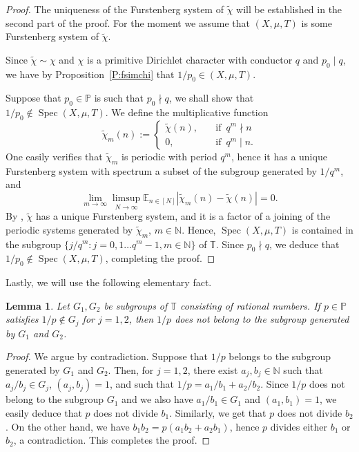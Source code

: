 \documentclass[11pt]{amsart}
\newtheorem{lemma}{Lemma}[section]
\theoremstyle{definition}
\newcommand{\E}{{\mathbb E}}
\newcommand{\N}{{\mathbb N}}
\renewcommand{\P}{{\mathbb P}}
\newcommand{\T}{{\mathbb T}}
\DeclareMathOperator{\spec}{Spec}
\begin{document}
\begin{proof}
The uniqueness of the Furstenberg system of $\tilde{\chi}$ will be established in the second part of the proof. For the moment we assume that $(X,\mu,T)$ is some Furstenberg system of $\tilde{\chi}$. 

Since $\tilde{\chi}\sim \chi$ and  $\chi$ is a primitive Dirichlet character with conductor $q$ and $p_0\mid q$,  we have by Proposition~\ref{P:fsimchi} that $1/p_0\in (X,\mu,T)$. 


 Suppose that $p_0\in \P$ is such that  $p_0\nmid q$, we shall   show that $1/p_0\not\in \spec(X,\mu,T)$. We define the multiplicative function 
$$
\tilde{\chi}_m(n):=\begin{cases}
	\tilde{\chi}(n), \quad & \text{if }\,  q^m\nmid n \\
	0, \quad & \text{if } \, q^m\mid n.
\end{cases} 
$$
One easily verifies that $\tilde{\chi}_m$ is periodic with period $q^m$, hence it has a unique  Furstenberg system with spectrum   a subset of  the subgroup generated by $1/q^m$, and 
$$
\lim_{m\to\infty}\limsup_{N\to\infty}\E_{n\in[N]} |\tilde{\chi}_m(n)-\tilde{\chi}(n)|=0.
$$
By   \cite[Lemma~3.17]{BPLR19},  $\tilde{\chi}$ has a unique Furstenberg system, and it  is a factor of
a joining of the periodic systems generated by $\tilde{\chi}_m$, $m\in \N$.
Hence,
$\spec(X,\mu,T)$ is contained in the subgroup $\{j/q^m\colon j=0,1\ldots q^m-1,m\in \N\}$ of $\T$.  Since  $p_0\nmid q$, we deduce that $1/p_0\not\in \spec(X,\mu,T)$, completing the proof.
\end{proof}
Lastly, we will use the following elementary fact. 

\begin{lemma}\label{L:2rational} Let $G_1,G_2$ be subgroups of $\T$ consisting of rational numbers. If  $p\in\P$ satisfies
$1/p\not\in G_j$ for   $j=1,2$, then $1/p$ does not belong to the subgroup generated by  $G_1$ and $G_2$.
\end{lemma}
\begin{proof}
We argue by contradiction. Suppose that $1/p$ belongs to the subgroup generated by $G_1$ and $G_2$. Then, for $j=1,2$, there exist $a_j,b_j \in \N$ such that $a_j/b_j\in G_j$, $(a_j,b_j)=1$, and such that
	$1/p=a_1/b_1+a_2/b_2.$
	Since $1/p$ does not belong to the subgroup $G_1$ and we also have
	$a_1/b_1\in G_1$
	and $(a_1,b_1)=1$, we easily deduce  that $p$ does not divide $b_1$. Similarly, we get that $p$ does not divide $b_2$.   On the other hand, we have $b_1b_2=p(a_1b_2+a_2b_1)$, hence $p$ divides either $b_1$ or $b_2$,
	a contradiction. This completes the proof.
\end{proof}
\end{document}
